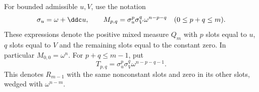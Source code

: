 
For bounded admissible $u,V$, use the notation
\[
 \sigma_u=\omega+\ddc u,\qquad
 M_{p,q}=\sigma_u^p\sigma_V^q\omega^{n-p-q}
                    \quad(0\leq p+q\leq m).
\]
These expressions denote the positive mixed measure $Q_m$ with
$p$ slots equal to $u$, $q$ slots equal to $V$ and the remaining
slots equal to the constant zero. In particular $M_{0,0}=\omega^n$.
For $p+q\leq m-1$, put
\[
 T_{p,q}=\sigma_u^p\sigma_V^q\omega^{n-p-q-1}.
\]
This denotes $R_{m-1}$ with the same nonconstant slots and zero
in its other slots, wedged with $\omega^{n-m}$.

